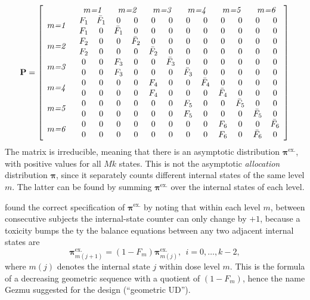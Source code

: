 \begin{equation}\label{eq:kPmat}
\mathbf{P}=\left[\begin{array}{p{1cm}cccccccccccc}
& \multicolumn{2}{c}{\emph{$m$=1}} & \multicolumn{2}{c}{\emph{$m$=2}}& \multicolumn{2}{c}{\emph{$m$=3}}& \multicolumn{2}{c}{\emph{$m$=4}}& \multicolumn{2}{c}{\emph{$m$=5}}& \multicolumn{2}{c}{\emph{$m$=6}} \\
  \multirow{2}{*}{\emph{$m$=1}} &  F_1 &\bar{F}_1 &0 &0 &0 &0 &0 &0 &0 &0 &0 & 0\\
   &  F_1 &0         &\bar{F}_1 &0 &0 &0 &0 &0 &0 &0 &0& 0\\
  \multirow{2}{*}{\emph{$m$=2}} &  F_2 &0 &0 &\bar{F}_2 &0 &0 &0 &0 &0 &0 &0& 0\\
 &   F_2 &0 &0 &0 &\bar{F}_2  &0 &0 &0 &0 &0 &0& 0\\
  \multirow{2}{*}{\emph{$m$=3}} &  0    &0 &F_3 &0 &0   &\bar{F}_3 &0 &0 &0 &0 &0& 0\\
  &  0    &0 &F_3 &0 &0   &0 &\bar{F}_3 &0 &0 &0 &0& 0\\
  \multirow{2}{*}{\emph{$m$=4}} &  0    &0 &0   &0 &F_4 &0 & 0&\bar{F}_4 &0 &0 &0 &0\\
  &  0    &0 &0   &0 &F_4 &0 &0      & 0   &\bar{F}_4 &0 &0 &0\\
  \multirow{2}{*}{\emph{$m$=5}} &  0    &0 &0   &0 &0   &0 &F_5    & 0   &0 &\bar{F}_5 &0 &0\\
  &  0    &0 &0   &0 &0   &0 &F_5    & 0   &0 &0 &\bar{F}_5 &0\\
 \multirow{2}{*}{\emph{$m$=6}} &   0    &0 &0   &0 &0   &0 &0         &0 &F_6 &0 & 0&\bar{F}_6\\
  &  0    &0 &0   &0 &0   &0 &0         &0 &F_6 & 0 &\bar{F}_6 & 0\\
\end{array}\right]
\end{equation}
The matrix is irreducible, meaning that there is an asymptotic distribution $\boldsymbol{\pi}^{\textrm{ex.}}$, with positive values for all $Mk$ states. This is not the asymptotic \emph{allocation} distribution $\boldsymbol{\pi}$, since it separately counts different internal states of the same level $m$. The latter can be found by summing $\boldsymbol{\pi}^{\textrm{ex.}}$ over the internal states of each level.

\cite{Gezm:Geom:1996} found the correct specification of $\boldsymbol{\pi}^{\textrm{ex.}}$ by noting that within each level $m$, between consecutive subjects the internal-state counter can only change by $+1$, because a toxicity bumps the  ty the balance equations between any two adjacent internal states are
\begin{equation}\label{eq:kinternal}
\boldsymbol{\pi}^{\textrm{ex.}}_{m(j+1)}=\left(1-F_m\right)\boldsymbol{\pi}^{\textrm{ex.}}_{m(j)},\ \ i=0,\ldots,k-2,
\end{equation}
\noindent where $m(j)$ denotes the internal state $j$ within dose level $m$. This is the formula of a decreasing geometric sequence with a quotient of $\left(1-F_m\right)$, hence the name Gezmu suggested for the design (``geometric UD'').

